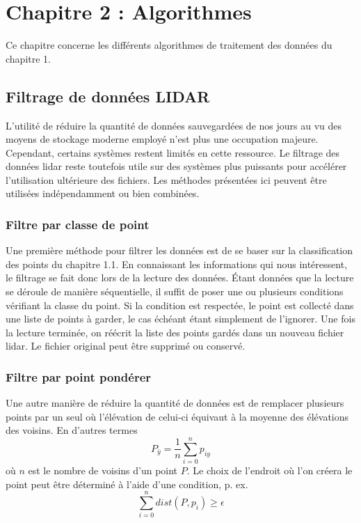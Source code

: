 \chapter{Chapitre 2 : Algorithmes}

Ce chapitre concerne les différents algorithmes de traitement des données du chapitre 1.

\section{Filtrage de données LIDAR}

L'utilité de réduire la quantité de données sauvegardées de nos jours au vu des moyens de stockage moderne employé n'est plus une occupation majeure.
Cependant, certains systèmes restent limités en cette ressource.
Le filtrage des données \gls{lidar} reste toutefois utile sur des systèmes plus puissants pour accélérer l'utilisation ultérieure des fichiers. Les méthodes présentées ici peuvent être utilisées indépendamment ou bien combinées.

\subsection{Filtre par classe de point}
Une première méthode pour filtrer les données est de se baser sur la classification des points du chapitre 1.1. En connaissant les informations qui nous intéressent, le filtrage se fait donc lors de la lecture des données.
Étant données que la lecture se déroule de manière séquentielle, il suffit de poser une ou plusieurs conditions vérifiant la classe du point.
Si la condition est respectée, le point est collecté dans une liste de points à garder, le cas échéant étant simplement de l'ignorer.
Une fois la lecture terminée, on réécrit la liste des points gardés dans un nouveau fichier \gls{lidar}.
Le fichier original peut être supprimé ou conservé.

\subsection{Filtre par point pondérer}

Une autre manière de réduire la quantité de données est de remplacer plusieurs points par un seul où l'élévation de celui-ci équivaut à la moyenne des élévations des voisins.
En d'autres termes $$ P_{\bar{y}} = \frac{1}{n} \sum_{i=0}^{n} p_{iy} $$
où $n$ est le nombre de voisins d'un point $P$. 
Le choix de l'endroit où l'on créera le point peut être déterminé à l'aide d'une condition, p. ex. $$\sum_{i=0}^n dist(P, p_i) \geq \epsilon$$

